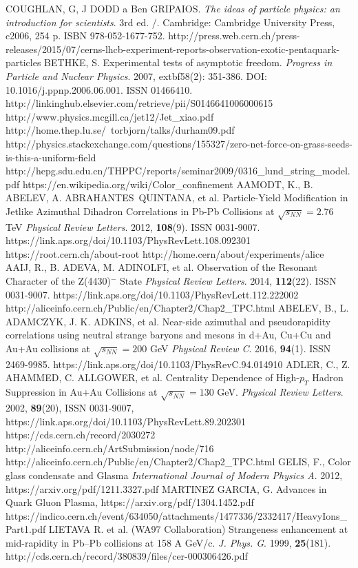 \documentclass[thesismargins, thesislinespacing]{rnthesis}
\begin{document}
\renewcommand{\bibname}{Zoznam pou�itej literat�ry}
\begin{thebibliography}{}
COUGHLAN, G, J DODD a Ben GRIPAIOS. \textit{The ideas of particle physics: an introduction for scientists}. 3rd ed. /. Cambridge: Cambridge University Press, c2006, 254 p. ISBN 978-052-1677-752.
http://press.web.cern.ch/press-releases/2015/07/cerns-lhcb-experiment-reports-observation-exotic-pentaquark-particles
BETHKE, S. Experimental tests of asymptotic freedom. \textit{Progress in Particle and Nuclear Physics}. 2007, extbf{58}(2): 351-386. DOI: 10.1016/j.ppnp.2006.06.001. ISSN 01466410.  http://linkinghub.elsevier.com/retrieve/pii/S0146641006000615
http://www.physics.mcgill.ca/jet12/Jet\_xiao.pdf
http://home.thep.lu.se/~torbjorn/talks/durham09.pdf	
http://physics.stackexchange.com/questions/155327/zero-net-force-on-grass-seeds-is-this-a-uniform-field
http://hepg.sdu.edu.cn/THPPC/reports/seminar2009/0316\_lund\_string\_model.pdf
https://en.wikipedia.org/wiki/Color\_confinement
AAMODT, K., B. ABELEV, A. ABRAHANTES QUINTANA, et al. Particle-Yield Modification in Jetlike Azimuthal Dihadron Correlations in Pb-Pb Collisions at $\sqrt{s_{NN}} = 2.76$ TeV \textit{Physical Review Letters}. 2012, \textbf{108}(9). ISSN 0031-9007. https://link.aps.org/doi/10.1103/PhysRevLett.108.092301
https://root.cern.ch/about-root
http://home.cern/about/experiments/alice
AAIJ, R., B. ADEVA, M. ADINOLFI, et al. Observation of the Resonant Character of the Z(4430)$^{-}$ State \textit{Physical Review Letters}. 2014, \textbf{112}(22). ISSN 0031-9007. https://link.aps.org/doi/10.1103/PhysRevLett.112.222002
http://aliceinfo.cern.ch/Public/en/Chapter2/Chap2\_TPC.html
ABELEV, B., L. ADAMCZYK, J. K. ADKINS, et al. Near-side azimuthal and pseudorapidity correlations using neutral strange baryons and mesons in d+Au, Cu+Cu and Au+Au collisions at $\sqrt{s_{NN}}=200$ GeV \textit{Physical Review C}. 2016, \textbf{94}(1). ISSN 2469-9985. https://link.aps.org/doi/10.1103/PhysRevC.94.014910
ADLER, C., Z. AHAMMED, C. ALLGOWER, et al. Centrality Dependence of High-$p_T$ Hadron Suppression in Au+Au Collisions at $\sqrt{s_{NN}} = 130$ GeV. \textit{Physical Review Letters}. 2002, \textbf{89}(20), ISSN 0031-9007, https://link.aps.org/doi/10.1103/PhysRevLett.89.202301
https://cds.cern.ch/record/2030272
http://aliceinfo.cern.ch/ArtSubmission/node/716
http://aliceinfo.cern.ch/Public/en/Chapter2/Chap2\_TPC.html
GELIS, F., Color glass condensate and Glasma \textit{International Journal of Modern Physics A}. 2012, https://arxiv.org/pdf/1211.3327.pdf
MARTINEZ GARCIA, G. Advances in Quark Gluon Plasma, https://arxiv.org/pdf/1304.1452.pdf
https://indico.cern.ch/event/634050/attachments/1477336/2332417/HeavyIons\_Part1.pdf
LIETAVA R.  et al. (WA97 Collaboration) Strangeness enhancement at mid-rapidity in Pb–Pb collisions at 158 A GeV/c. \textit{J. Phys. G}. 1999,  \textbf{25}(181). http://cds.cern.ch/record/380839/files/cer-000306426.pdf 
\end{thebibliography}
%
\end{document}
